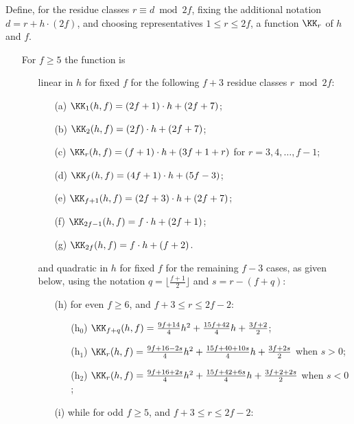 \begin{definition}\label{def:KK}
Define, for the residue classes $r\equiv d\bmod 2f$, 
fixing the additional notation
$d=r+h\cdot (2f)$, and choosing representatives $1\leq r\leq 2f$,
a function $\KK_{r}$ of $h$ and $f$.

\begin{itemize}
\item[] For $f\geq 5$
the function is 
\begin{itemize}
\item[] linear in $h$ for fixed $f$ for the following $f+3$ residue classes $r\bmod 2f$:
\begin{itemize}
\item[(a)] $\KK_{1}(h,f)=(2f+1)\cdot h+(2f+7)$;
\item[(b)] $\KK_{2}(h,f)=(2f)\cdot h+(2f+7)$;
\item[(c)] $\KK_{r}(h,f)=(f+1)\cdot h+(3f+1+r)$
for $r=3, 4,\ldots,f-1$;
\item[(d)] $\KK_{f}(h,f)=(4f+1)\cdot h+(5f-3)$;
\item[(e)] $\KK_{f+1}(h,f)=(2f+3)\cdot h+(2f+7)$;
\item[(f)] $\KK_{2f-1}(h,f)=f\cdot h+(2f+1)$;
\item[(g)] $\KK_{2f}(h,f)=f\cdot h+(f+2)$.
\end{itemize}
\item[] and quadratic in $h$ for fixed $f$ for the remaining $f-3$ cases, as given below,
using the notation $q=\lfloor\frac{f+1}{2}\rfloor$ and $s=r-(f+q)$:
\begin{itemize}
\item[(h)] for even $f\geq 6$, and $f+3\leq r\leq 2f-2$:
\begin{itemize}
\item[(h$_0$)] $\KK_{f+q}(h,f)=\frac{9f+14}{4}h^2+\frac{15f+42}{4}h+
\frac{3f+2}{2}$;
\item[(h$_1$)] $\KK_{r}(h,f)=\frac{9f+16-2s}{4}h^2+\frac{15f+40+10s}{4}h+\frac{3f+2s}{2}$ when $s>0$; %
\item[(h$_2$)] $\KK_{r}(h,f)=\frac{9f+16+2s}{4}h^2+
\frac{15f+42+6s}{4}h+\frac{3f+2+2s}{2}$
when $s<0$; %
\end{itemize}
\item[(i)] while for odd $f\geq 5$, and $f+3\leq r\leq 2f-2$:
\end{itemize}
\end{itemize}
\end{itemize}
\end{definition}
